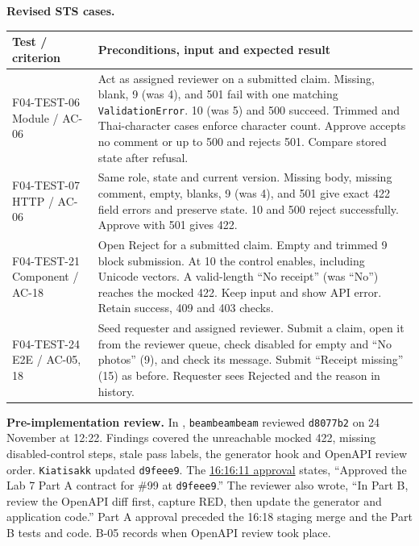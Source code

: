 \textbf{Revised STS cases.}
\begin{longtable}{@{}R{3.3cm}R{12.8cm}@{}}
\toprule
\textbf{Test / criterion} & \textbf{Preconditions, input and expected result} \\ \midrule \endhead
F04-TEST-06 \newline Module / AC-06 & Act as assigned reviewer on a submitted claim. Missing, blank, 9 (was 4), and 501 fail with one matching \texttt{ValidationError}. 10 (was 5) and 500 succeed. Trimmed and Thai-character cases enforce character count. Approve accepts no comment or up to 500 and rejects 501. Compare stored state after refusal. \\
F04-TEST-07 \newline HTTP / AC-06 & Same role, state and current version. Missing body, missing comment, empty, blanks, 9 (was 4), and 501 give exact 422 field errors and preserve state. 10 and 500 reject successfully. Approve with 501 gives 422. \\
F04-TEST-21 \newline Component / AC-18 & Open Reject for a submitted claim. Empty and trimmed 9 block submission. At 10 the control enables, including Unicode vectors. A valid-length “No receipt” (was “No”) reaches the mocked 422. Keep input and show API error. Retain success, 409 and 403 checks. \\
F04-TEST-24 \newline E2E / AC-05, 18 & Seed requester and assigned reviewer. Submit a claim, open it from the reviewer queue, check disabled for empty and “No photos” (9), and check its message. Submit “Receipt missing” (15) as before. Requester sees Rejected and the reason in history. \\
\bottomrule
\end{longtable}

\textbf{Pre-implementation review.}
In , \texttt{beambeambeam} reviewed \texttt{d8077b2} on 24 November at 12:22. Findings covered the unreachable mocked 422, missing disabled-control steps, stale pass labels, the generator hook and OpenAPI review order. \texttt{Kiatisakk} updated \texttt{d9feee9}. The \href{\repo/pull/101\#pullrequestreview-6043052471}{16:16:11 approval} states, “Approved the Lab 7 Part A contract for \#99 at \texttt{d9feee9}.” The reviewer also wrote, “In Part B, review the OpenAPI diff first, capture RED, then update the generator and application code.” Part A approval preceded the 16:18 staging merge and the Part B tests and code. B-05 records when OpenAPI review took place.
